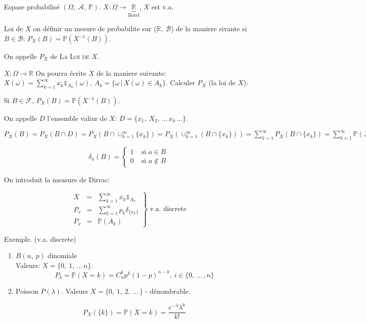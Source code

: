 Espase probabilisé $(\Omega,\ \mathcal{A},\ \mathbb{P})$. $X:\Omega\rightarrow\underbrace{\mathbb{R}}_\text{Borel}$,  $X$ est v.a. 

Loi de $X$ on définir un mesure de probabilite sur ($\mathbb{R},\ \mathcal{B}$) de la maniere sivante si $B\in\mathcal{B}$: $P_X(B)=\mathbb{P}(X^{-1}(B))$.

On appelle $P_X$ de \textsc{La Loi de $X$}.

$X:\Omega\rightarrow\mathbb{R}$ On pourra écrite $X$ de la maniere suivante: $X(\omega)=\sum_{k=1}^\infty x_k \mathbb{1}_{A_k}(\omega)$, $A_k=\{\omega\, |\, X(\omega)\in A_k\}$. Calculer $P_X$ (la loi de $X$):

Si $B\in\mathcal{F}$, $P_X(B) = \mathbb{P}(X^{-1}(B))$.

On appelle $D$ l'ensemble valiur de $X$: $D=\{x_1,\ X_2,\, ...\,x_k\, ...\}$.

$P_X(B)=P_X(B\cap D)=P_X(B\cap \cup_{k=1}^\infty\{x_k\})=P_X(\cup_{k=1}^\infty(B\cap \{x_k\}))=\sum_{k=1}^\infty P_X(B\cap \{x_k\})=\sum_{k=1}^\infty \mathbb{P}(X=x_k)\delta_{\{x_k\}}(B)=\sum_{k=1}^\infty p_k \delta_{\{x_k\}}(B)$

$$\delta_a(B)=\left\{
\begin{array}{rl}
	1 & \mbox{ si } a\in B \\ 
	0 & \mbox{ si } a\notin B
\end{array}\right.$$

On introduit la measure de Dirrac:

$$\left. \begin{array}{rrl}
	X & = &\sum\limits_{k=1}^\infty x_k \mathbb{1}_{A_k}\\ 
	P_x & = & \sum\limits_{k=1}^\infty p_k \delta_{\{x_k\}}\\
	P_x & = & \mathbb{P}(A_k)
\end{array}\right\}\text{ v.a. discrete}$$

Exemple. (v.a. discrete)
\begin{enumerate}
	
	\item $B(n,\ p)$ dinomiale\\
Valeurs: $X=\{0,\ 1,\,...\, n\}$.
$$P_k=\mathbb{P}(X=k)=C_n^k p^k (1-p)^{n-k},\ i\in\{0,\, ...\,, n\}$$
	\item Poisson $P(\lambda)$. Valeurs $X=\{0,\ 1,\ 2,\, ...\,\}$ - dénombrable.
	
	$$P_X(\{k\})=\mathbb{P}(X=k)=\frac{e^{-\lambda}\lambda^k}{k!}$$ 
\end{enumerate}

